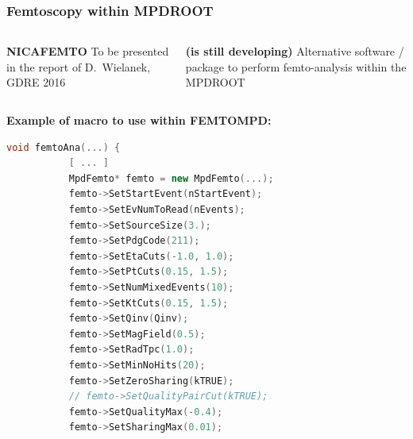 \documentclass[dvipsnames] {beamer}
\begin{document}
\begin{frame}[fragile, shrink=47]
  \bf 
   \frametitle{\bf \centering Femtoscopy within MPDROOT}
   \begin{columns}[c]
     \begin{block}{\bf \centering NICAFEMTO}
       To be presented in the report of D.~Wielanek, GDRE 2016
     \end{block}
     \begin{block}{\bf {} (is still developing)}
       Alternative software / package to perform femto-analysis within the MPDROOT
     \end{block}
   \end{columns}
   \begin{columns}[c]
   \begin{block}{\bf \centering Example of macro to use within FEMTOMPD:}
     \begin{lstlisting}[language=C++,basicstyle=\ttfamily,keywordstyle=\color{red}]
       void femtoAna(...) {
           [ ... ] 
           MpdFemto* femto = new MpdFemto(...);
           femto->SetStartEvent(nStartEvent);
           femto->SetEvNumToRead(nEvents);
           femto->SetSourceSize(3.); 
           femto->SetPdgCode(211);
           femto->SetEtaCuts(-1.0, 1.0); 
           femto->SetPtCuts(0.15, 1.5); 
           femto->SetNumMixedEvents(10); 
           femto->SetKtCuts(0.15, 1.5); 
           femto->SetQinv(Qinv);
           femto->SetMagField(0.5); 
           femto->SetRadTpc(1.0);
           femto->SetMinNoHits(20);
           femto->SetZeroSharing(kTRUE);   
           // femto->SetQualityPairCut(kTRUE);
           femto->SetQualityMax(-0.4);
           femto->SetSharingMax(0.01);


\end{lstlisting}
\end{block}
\end{columns}
\end{frame}
\end{document}
